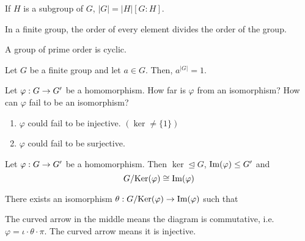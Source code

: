\documentclass[11pt,letterpaper]{jacky}
\begin{document}
\begin{bthm}
    If $H$ is a subgroup of $G$, $|G|=|H|[G:H]$.
\end{bthm}

\begin{cor}
    In a finite group, the order of every element divides the order of the group.
\end{cor}

\begin{cor}
    A group of prime order is cyclic.
\end{cor}

\begin{cor}
    Let $G$ be a finite group and let $a\in G$. Then, $a^{|G|}=1$.
\end{cor}

Let $\hmap{G}{G'}$ be a homomorphism. How far is $\varphi$ from an isomorphism? How can $\varphi$ fail to be an isomorphism?
\begin{enumerate}
    \item $\varphi$ could fail to be injective. $(\ker\ne\{1\})$
    \item $\varphi$ could fail to be surjective.
\end{enumerate}

\begin{bthm}
    Let $\hmap{G}{G'}$ be a homomorphism. Then $\ker\unlhd G$, $\im\le G'$ and
    $$G/\ker\cong\im$$
\end{bthm}

\begin{prop}
    There exists an isomorphism $\hmap[\theta]{G/\ker}{\im}$ such that
    \begin{center}
    \end{center}
    The curved arrow in the middle means the diagram is commutative, i.e. $\varphi=\iota\cdot\theta\cdot\pi$. The curved arrow means it is injective.
\end{prop}
\end{document}
